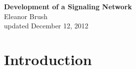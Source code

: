 \documentclass{article}
\begin{document}
\begin{center}
\Large

\end{center}


\vspace{0pt}

\begin{center}
{\bf \LARGE{Development of a Signaling Network}}
\vspace{10pt}
\\ Eleanor Brush
\\ updated December 12, 2012
\end{center}

\tableofcontents

\vspace{0pt}
\normalsize

\section{Introduction}
\end{document}
